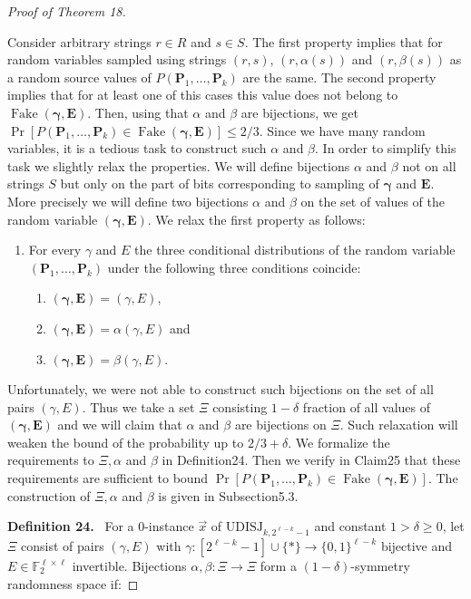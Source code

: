\documentclass[10pt,a4paper]{article}
\newenvironment{authorclaim}[1]{\par\medskip\noindent\textbf{#1.}\ \ignorespaces}{\par\medskip}
\begin{document}
\begin{proof}[Proof of Theorem 18]
\begin{enumerate}
\end{enumerate}
Consider arbitrary strings $r\in R$ and $s\in S$. The first property implies that for random variables sampled using strings $(r,s)$, $(r,\alpha(s))$ and $(r,\beta(s))$ as a random source values of $P(\mathbf P_1,\ldots,\mathbf P_k)$ are the same. The second property implies that for at least one of this cases this value does not belong to $\operatorname{Fake}(\boldsymbol\gamma,\mathbf E)$. Then, using that $\alpha$ and $\beta$ are bijections, we get $\Pr[P(\mathbf P_1,\ldots,\mathbf P_k)\in\operatorname{Fake}(\boldsymbol\gamma,\mathbf E)]\le2/3$.
Since we have many random variables, it is a tedious task to construct such $\alpha$ and $\beta$. In order to simplify this task we slightly relax the properties. We will define bijections $\alpha$ and $\beta$ not on all strings $S$ but only on the part of bits corresponding to sampling of $\boldsymbol\gamma$ and $\mathbf E$. More precisely we will define two bijections $\alpha$ and $\beta$ on the set of values of the random variable $(\boldsymbol\gamma,\mathbf E)$. We relax the first property as follows:
\begin{enumerate}
\item[1'.] For every $\gamma$ and $E$ the three conditional distributions of the random variable $(\mathbf P_1,\ldots,\mathbf P_k)$ under the following three conditions coincide:
\begin{enumerate}\item $(\boldsymbol\gamma,\mathbf E)=(\gamma,E)$,\item $(\boldsymbol\gamma,\mathbf E)=\alpha(\gamma,E)$ and\item $(\boldsymbol\gamma,\mathbf E)=\beta(\gamma,E)$.\end{enumerate}
\end{enumerate}
Unfortunately, we were not able to construct such bijections on the set of all pairs $(\gamma,E)$. Thus we take a set $\Xi$ consisting $1-\delta$ fraction of all values of $(\boldsymbol\gamma,\mathbf E)$ and we will claim that $\alpha$ and $\beta$ are bijections on $\Xi$. Such relaxation will weaken the bound of the probability up to $2/3+\delta$. We formalize the requirements to $\Xi,\alpha$ and $\beta$ in Definition24. Then we verify in Claim25 that these requirements are sufficient to bound $\Pr[P(\mathbf P_1,\ldots,\mathbf P_k)\in\operatorname{Fake}(\boldsymbol\gamma,\mathbf E)]$. The construction of $\Xi,\alpha$ and $\beta$ is given in Subsection5.3.
\begin{authorclaim}{Definition 24}
For a 0-instance $\vec x$ of $\mathrm{UDISJ}_{k,2^{\ell-k}-1}$ and constant $1>\delta\ge0$, let $\Xi$ consist of pairs $(\gamma,E)$ with $\gamma:[2^{\ell-k}-1]\cup\{*\}\to\{0,1\}^{\ell-k}$ bijective and $E\in\mathbb F_2^{\ell\times\ell}$ invertible. Bijections $\alpha,\beta:\Xi\to\Xi$ form a $(1-\delta)$-symmetry randomness space if:

\end{authorclaim}
\end{proof}
\end{document}
